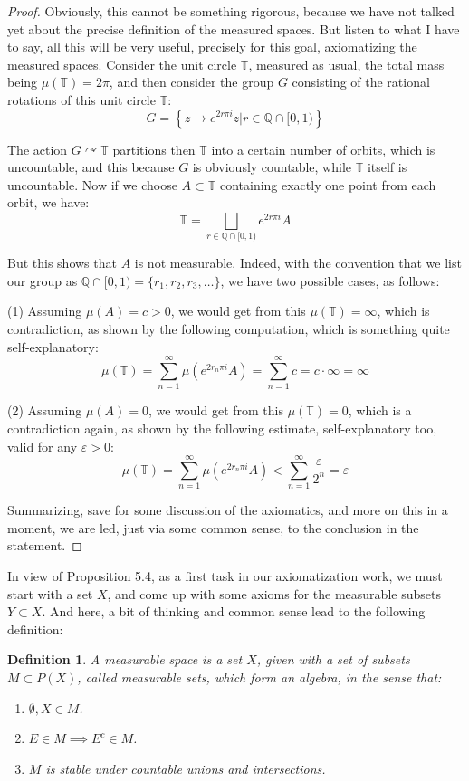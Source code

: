 \documentclass[12pt]{amsbook}
\newtheorem{definition}[theorem]{Definition}
\begin{document}
\begin{proof}
Obviously, this cannot be something rigorous, because we have not talked yet about the precise definition of the measured spaces. But listen to what I have to say, all this will be very useful, precisely for this goal, axiomatizing the measured spaces. Consider the unit circle $\mathbb T$, measured as usual, the total mass being $\mu(\mathbb T)=2\pi$, and then consider the group $G$ consisting of the rational rotations of this unit circle $\mathbb T$:
$$G=\left\{z\to e^{2r\pi i}z\Big|r\in\mathbb Q\cap[0,1)\right\}$$

The action $G\curvearrowright\mathbb T$ partitions then $\mathbb T$ into a certain number of orbits, which is uncountable, and this because $G$ is obviously countable, while $\mathbb T$ itself is uncountable. Now if we choose $A\subset\mathbb T$ containing exactly one point from each orbit, we have:
$$\mathbb T=\bigsqcup_{r\in\mathbb Q\cap[0,1)}e^{2r\pi i}A$$  

But this shows that $A$ is not measurable. Indeed, with the convention that we list our group as $\mathbb Q\cap[0,1)=\{r_1,r_2,r_3,\ldots\}$, we have two possible cases, as follows:

\medskip

(1) Assuming $\mu(A)=c>0$, we would get from this $\mu(\mathbb T)=\infty$, which is contradiction, as shown by the following computation, which is something quite self-explanatory:
$$\mu(\mathbb T)=\sum_{n=1}^\infty\mu(e^{2r_n\pi i}A)=\sum_{n=1}^\infty c=c\cdot\infty=\infty$$

(2) Assuming $\mu(A)=0$, we would get from this $\mu(\mathbb T)=0$, which is a contradiction again, as shown by the following estimate, self-explanatory too, valid for any $\varepsilon>0$:
$$\mu(\mathbb T)=\sum_{n=1}^\infty\mu(e^{2r_n\pi i}A)<\sum_{n=1}^\infty\frac{\varepsilon}{2^n}=\varepsilon$$

Summarizing, save for some discussion of the axiomatics, and more on this in a moment, we are led, just via some common sense, to the conclusion in the statement.
\end{proof}

In view of Proposition 5.4, as a first task in our axiomatization work, we must start with a set $X$, and come up with some axioms for the measurable subsets $Y\subset X$. And here, a bit of thinking and common sense lead to the following definition:


\begin{definition}
A measurable space is a set $X$, given with a set of subsets $M\subset P(X)$, called measurable sets, which form an algebra, in the sense that:
\begin{enumerate}
\item $\emptyset,X\in M$.

\item $E\in M\implies E^c\in M$.

\item $M$ is stable under countable unions and intersections.
\end{enumerate}
\end{definition}
\end{document}
